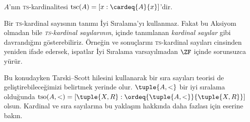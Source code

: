 \documentclass[../../../include/open-logic-section]{subfiles}
\begin{document}
\begin{defn}
$A$'nın \textsc{ts}-kardinalitesi
$\text{tsc}(A)=[x:\cardeq{A}{x}]$'dir.
\end{defn}

Bir \textsc{ts}-kardinal sayısının tanımı İyi Sıralama'yı kullanmaz.
Fakat bu Aksiyom olmadan bile \emph{\textsc{ts}-kardinal sayılarının},
 içinde tanımlanan
\emph{kardinal sayılar} gibi davrandığını gösterebiliriz. Örneğin
 ve
 sonuçlarını
\textsc{ts}-kardinal sayıları cinsinden yeniden ifade edersek, ispatlar
İyi Sıralama varsayılmadan $\ZF$ içinde sorunsuzca yürür.

Bu konudayken Tarski--Scott hilesini kullanarak bir sıra sayıları teorisi
de geliştirebileceğimizi belirtmek yerinde olur. $\tuple{A,<}$ bir iyi
sıralama olduğunda
$\text{tso}(A,<)=[\tuple{X,R}:\ordeq{\tuple{A,<}}{\tuple{X,R}}]$ olsun.
Kardinal ve sıra sayılarına bu yaklaşım hakkında daha fazlası için
\citet[chs.~9--12]{Potter2004} eserine bakın.
\end{document}
